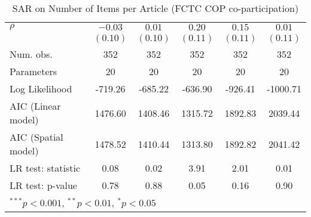 \begin{table}[!h]
\begin{center}
\begin{tabular}{l c c c c c }
$\rho$                  & $-0.03$      & $0.01$       & $0.20$       & $0.15$       & $0.01$       \\
                        & $(0.10)$     & $(0.10)$     & $(0.11)$     & $(0.11)$     & $(0.11)$     \\
\midrule
Num. obs.               & 352          & 352          & 352          & 352          & 352          \\
Parameters              & 20           & 20           & 20           & 20           & 20           \\
Log Likelihood          & -719.26      & -685.22      & -636.90      & -926.41      & -1000.71     \\
AIC (Linear model)      & 1476.60      & 1408.46      & 1315.72      & 1892.83      & 2039.44      \\
AIC (Spatial model)     & 1478.52      & 1410.44      & 1313.80      & 1892.82      & 2041.42      \\
LR test: statistic      & 0.08         & 0.02         & 3.91         & 2.01         & 0.01         \\
LR test: p-value        & 0.78         & 0.88         & 0.05         & 0.16         & 0.90         \\
\bottomrule
\multicolumn{6}{l}{\scriptsize{$^{***}p<0.001$, $^{**}p<0.01$, $^*p<0.05$}}
\end{tabular}
\caption{SAR on Number of Items per Article (FCTC COP co-participation)}
\label{table:coefficients}
\end{center}
\end{table}
